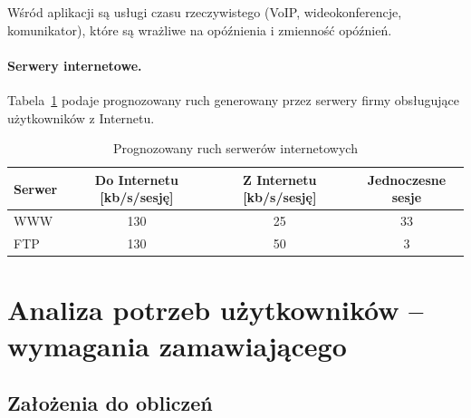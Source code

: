 \documentclass[12pt,a4paper]{article}
\begin{document}
Wśród aplikacji są usługi czasu rzeczywistego (VoIP, wideokonferencje,
komunikator), które są wrażliwe na opóźnienia i zmienność opóźnień.

\paragraph{Serwery internetowe.} Tabela~\ref{tab:serwery} podaje prognozowany
ruch generowany przez serwery firmy obsługujące użytkowników z Internetu.

\begin{table}[htbp]
\centering
\caption{Prognozowany ruch serwerów internetowych}
\label{tab:serwery}
\begin{tabular}{lccc}
\toprule
Serwer & Do Internetu [kb/s/sesję] & Z Internetu [kb/s/sesję] & Jednoczesne sesje \\
\midrule
WWW & 130 & 25 & 33 \\
FTP & 130 & 50 &  3 \\
\bottomrule
\end{tabular}
\end{table}

\section{Analiza potrzeb użytkowników -- wymagania zamawiającego}

\subsection{Założenia do obliczeń}
\end{document}
